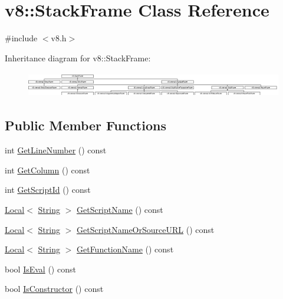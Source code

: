 \hypertarget{classv8_1_1_stack_frame}{}\section{v8\+:\+:Stack\+Frame Class Reference}
\label{classv8_1_1_stack_frame}


{\ttfamily \#include $<$v8.\+h$>$}

Inheritance diagram for v8\+:\+:Stack\+Frame\+:\begin{figure}[H]
\begin{center}
\leavevmode
\includegraphics[height=1.115538cm]{classv8_1_1_stack_frame}
\end{center}
\end{figure}
\subsection*{Public Member Functions}
\begin{DoxyCompactItemize}
\item 
int \hyperlink{classv8_1_1_stack_frame_a57886e590ac1a4c57ee6f6bf1009b5b1}{Get\+Line\+Number} () const 
\item 
int \hyperlink{classv8_1_1_stack_frame_a44eccfb1bf17221ab6f69e977f3aa3a2}{Get\+Column} () const 
\item 
int \hyperlink{classv8_1_1_stack_frame_ac449d55656f8b7638de3cf5f5530cb7a}{Get\+Script\+Id} () const 
\item 
\hyperlink{classv8_1_1_local}{Local}$<$ \hyperlink{classv8_1_1_string}{String} $>$ \hyperlink{classv8_1_1_stack_frame_ac32abf6f2f847d4ec20c064b75faf3a0}{Get\+Script\+Name} () const 
\item 
\hyperlink{classv8_1_1_local}{Local}$<$ \hyperlink{classv8_1_1_string}{String} $>$ \hyperlink{classv8_1_1_stack_frame_a29d211df51e85841d68936b6dcd459de}{Get\+Script\+Name\+Or\+Source\+U\+RL} () const 
\item 
\hyperlink{classv8_1_1_local}{Local}$<$ \hyperlink{classv8_1_1_string}{String} $>$ \hyperlink{classv8_1_1_stack_frame_a5f4ddee3b1be7444608abab1594e13b3}{Get\+Function\+Name} () const 
\item 
bool \hyperlink{classv8_1_1_stack_frame_ae45f4d6ff9398a00a0b6534c160ec0c7}{Is\+Eval} () const 
\item 
bool \hyperlink{classv8_1_1_stack_frame_ade01313f4a3f6b88691d9d544737f65c}{Is\+Constructor} () const 
\end{DoxyCompactItemize}


